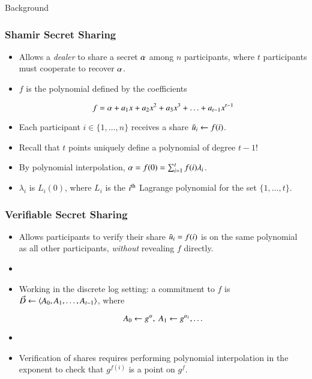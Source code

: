 \documentclass[hyperref={pdfpagelabels=true},table,dvipsnames,14pt,aspectratio=169]{beamer}
\begin{document}
\begin{frame}
  \huge
  \centering
  Background
\end{frame}

\begin{frame}
  \frametitle{Shamir Secret Sharing}

  \begin{itemize}
    \item<1-> Allows a \emph{dealer} to share a secret $\alpha$ among $n$ participants, where $t$ participants must cooperate to recover $\alpha$.
    \item<2-> $f$ is the polynomial defined by the coefficients

      \[f = \alpha + a_1 x + a_2 x^2 + a_3 x^3 + \ldots + a_{t-1}x^{t-1}  \]

    \item<3-> Each participant $i \in \{1, \ldots, n \}$ receives a share $\bar{u}_i \gets f(i) $.
    \item<4-> Recall that $t$ points uniquely define a polynomial of degree $t-1$!
    \item<5-> By polynomial interpolation, $\alpha = f(0) = \sum_{i=1}^t f(i) \lambda_i$.
    \item<6-> $\lambda_i$ is $L_i(0)$, where $L_i$ is the $i^{\textrm{\scriptsize th}}$ Lagrange polynomial for the set $\{1, \ldots, t \}$.
  \end{itemize}
\end{frame}

\begin{frame}
  \frametitle{Verifiable Secret Sharing}

  \begin{itemize}
    \item<1-> Allows participants to verify their share $\bar{u}_i = f(i)$ is on the same polynomial as all other participants,
      \emph{without} revealing $f$ directly.
    \item[]
    \item<2-> Working in the discrete log setting: a commitment to $f$ is $\vec{D} \gets \langle A_0, A_1, \ldots, A_{t-1}  \rangle$, where

      \[ A_0 \gets g^{\alpha},\ A_1 \gets g^{a_1}, \ldots \]
    \item[]
    \item<3-> Verification of shares requires performing polynomial interpolation in the exponent to check that $g^{f(i)}$ is a point on $g^f$.
  \end{itemize}
\end{frame}
\end{document}
